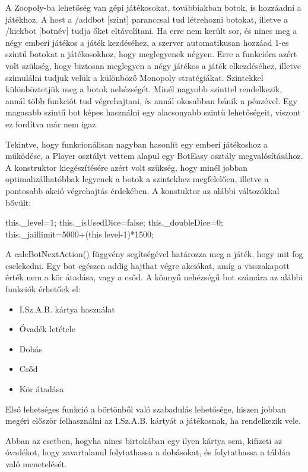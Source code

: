 
A Zoopoly-ba lehetőség van gépi játékosokat, továbbiakban botok, is hozzáadni a játékhoz. A host a /addbot [szint] paranccsal tud létrehozni botokat, illetve a /kickbot [botnév] tudja őket eltávolítani. Ha erre nem került sor, és nincs meg a négy emberi játékos a játék kezdéséhez, a szerver automatikusan hozzáad 1-es szintű botokat a játékosokhoz, hogy meglegyenek négyen. Erre a funkcióra azért volt szükség, hogy biztosan meglegyen a négy játékos a játék elkezdéséhez, illetve szimulálni tudjuk velük a különböző Monopoly stratégiákat. Szintekkel különböztetjük meg a botok nehézségét. Minél nagyobb szinttel rendelkezik, annál több funkciót tud végrehajtani, és annál okosabban bánik a pénzével. Egy magasabb szintű bot képes használni egy alacsonyabb szintű lehetőségeit, viszont ez fordítva már nem igaz.


Tekintve, hogy funkcionálisan nagyban hasonlít egy emberi játékoshoz a működése, a Player osztályt vettem alapul egy BotEasy osztály megvalósításához. A konstruktor kiegészítésére azért volt szükség, hogy minél jobban optimalizálhatóbbak legyenek a botok a szintekhez megfelelően, illetve a pontosabb akció végrehajtás érdekében.  A konstuktor az alábbi változókkal bővült:

\begin{javascript}
  this._level=1;
  this._isUsedDice=false;
  this._doubleDice=0;
  this._jaillimit=5000+(this.level-1)*1500;
\end{javascript}

A calcBotNextAction() függvény segítségével határozza meg a játék, hogy mit fog cselekedni. Egy bot egészen addig hajthat végre akciókat, amíg a visszakapott érték nem a kör átadása, vagy a csőd. A könnyű nehézségű bot számára az alábbi funkciók érhetőek el:
\newpage
\begin{itemize}
\item I.Sz.A.B. kártya használat
\item Óvadék letétele
\item Dobás
\item Csőd
\item Kör átadása
\end{itemize}

Első lehetséges funkció a börtönből való szabadulás lehetősége, hiszen jobban megéri először felhasználni az I.Sz.A.B. kártyát a játékosnak, ha rendelkezik vele.

Abban az esetben, hogyha nincs birtokában egy ilyen kártya sem, kifizeti az óvadékot, hogy zavartalanul folytathassa a dobásokat, és folytathassa a táblán való menetelését.

